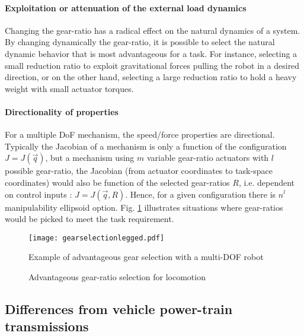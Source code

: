 \paragraph{Exploitation or attenuation of the external load dynamics}
Changing the gear-ratio has a radical effect on the natural dynamics of a system. By changing dynamically the gear-ratio, it is possible to select the natural dynamic behavior that is most advantageous for a task. For instance, selecting a small reduction ratio to exploit gravitational forces pulling the robot in a desired direction, or on the other hand, selecting a large reduction ratio to hold a heavy weight with small actuator torques.

\paragraph{Directionality of properties}
For a multiple DoF mechanism, the speed/force properties are directional. Typically the Jacobian of a mechanism is only a function of the configuration $J=J(\vec{q})$, but a mechanism using $m$ variable gear-ratio actuators with $l$ possible gear-ratio, the Jacobian (from actuator coordinates to task-space coordinates) would also be function of the selected gear-ratios $R$, i.e. dependent on control inputs : $J=J(\vec{q},R)$. Hence, for a given configuration there is $n^l$ manipulability ellipsoid option. Fig. \ref{fig:gearselectionlegged} illustrates situations where gear-ratios would be picked to meet the task requirement.


\begin{figure}[hb]
	\centering
		\texttt{[image: gearselectionlegged.pdf]}
	\caption{Example of advantageous gear selection with a multi-DOF robot}
	\label{fig:gearselectionlegged}
\end{figure}

\begin{figure}[hb]
        \centering
        \caption{Advantageous gear-ratio selection for locomotion}\label{fig:legsol}
\end{figure}


\subsection{Differences from vehicle power-train transmissions}

